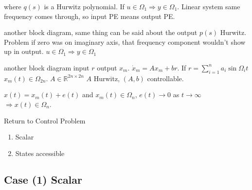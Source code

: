 
where $q(s)$ is a Hurwitz polynomial.
If $u\in\Omega_{1}\Rightarrow y\in\Omega_{1}$.
Linear system same frequency comes through, so input PE means output PE.\@

another block diagram, same thing can be said about the output $p(s)$ Hurwitz.
Problem if zero was on imaginary axis, that frequency component wouldn't show up in output.
$u\in\Omega_{1}\Rightarrow y\in\Omega_{1}$

another block diagram input $r$ output $x_{m}$.
$\dot{x}_{m}=Ax_{m}+br$.
If $r=\sum_{i=1}^{n}a_{i}\sin\Omega_{i}t$ $x_{m}(t)\in\Omega_{2n}$.
$A\in\mathbb{R}^{2n\times2n}$ $A$ Hurwitz, $(A,b)$ controllable.

$x(t)=x_{m}(t)+e(t)$ and $x_{m}(t)\in\Omega_{n}$, $e(t)\rightarrow0$ as $t\rightarrow\infty$ $\Rightarrow x(t)\in\Omega_{n}$.

Return to Control Problem
\begin{enumerate}
  \setlength{\itemsep}{-10pt}
  \item{Scalar}
  \item{States accessible}
\end{enumerate}

\subsection{Case (1) Scalar}

